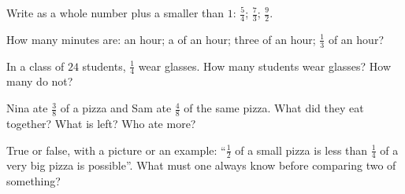 \begin{exercise}[$\star$]\label{exo:g4:fractions:7}
Write as a whole number plus a  smaller than $1$:
$\frac54$; \quad $\frac73$; \quad $\frac{9}{2}$.
\end{exercise}

\begin{exercise}[$\star$]\label{exo:g4:fractions:8}
How many minutes are:  an hour; a  of an hour; three
 of an hour; $\frac13$ of an hour?
\end{exercise}

\begin{exercise}[$\star$]\label{exo:g4:fractions:9}
In a class of $24$ students, $\frac14$ wear glasses. How many
students wear glasses? How many do not?
\end{exercise}

\begin{exercise}[$\star\star$]\label{exo:g4:fractions:10}
Nina ate $\frac38$ of a pizza and Sam ate $\frac48$ of the same
pizza. What  did they eat together? What  is left?
Who ate more?
\end{exercise}

\begin{exercise}[$\star\star$]\label{exo:g4:fractions:11}
True or false, with a picture or an example: ``$\frac12$ of a small
pizza is less than $\frac14$ of a very big pizza is possible''.
What must one always know before comparing two  of
something?
\end{exercise}
